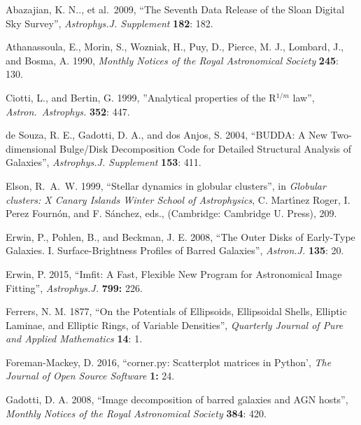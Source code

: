\documentclass[10pt,a4paper,article]{memoir}
\begin{document}
\begin{thebibliography}{}


 Abazajian, K. N.., et al.\ 2009, ``The Seventh 
Data Release of the Sloan Digital Sky Survey'', \textit{Astrophys.J. Supplement} \textbf{182}: 182.

 Athanassoula, E., Morin, S., Wozniak, H.,
Puy, D., Pierce, M. J., Lombard, J., and Bosma, A. 1990, \textit{Monthly Notices of the Royal
Astronomical Society} \textbf{245}: 130.

 Ciotti, L., and Bertin, G. 1999,
''Analytical properties of the R$^{1/m}$ law'', \textit{Astron.\ Astrophys.}
\textbf{352}: 447.

 de Souza, R. E.,
Gadotti, D. A., and dos Anjos, S. 2004, ``BUDDA: A New Two-dimensional Bulge/Disk
Decomposition Code for Detailed Structural Analysis of Galaxies'',
\textit{Astrophys.J. Supplement} \textbf{153}: 411.

 Elson, R.~A.~W. 1999, ``Stellar dynamics in globular clusters'',
in \textit{Globular clusters: X Canary Islands Winter School of Astrophysics}, 
C. Mart{\'{\i}}nez Roger, I. Perez Fourn{\'o}n, and F. S{\'a}nchez, eds., 
(Cambridge: Cambridge U. Press), 209.

 Erwin, P.,
Pohlen, B., and Beckman, J. E. 2008, ``The Outer Disks of Early-Type Galaxies. I. 
Surface-Brightness Profiles of Barred Galaxies'', \textit{Astron.J.} \textbf{135}: 20.

 Erwin, P. 2015, ``Imfit: A Fast, Flexible
New Program for Astronomical Image Fitting'', \textit{Astrophys.J.} \textbf{799:} 226.

 Ferrers, N. M. 1877, ``On the
Potentials of Ellipsoids, Ellipsoidal Shells, Elliptic Laminae, and
Elliptic Rings, of Variable Densities'', \textit{Quarterly Journal
of Pure and Applied Mathematics} \textbf{14}: 1.

 Foreman-Mackey, D. 2016,
``corner.py: Scatterplot matrices in Python', \textit{The Journal of Open Source Software}
\textbf{1:} 24.

 Gadotti, D. A. 2008, ``Image
decomposition of barred galaxies and AGN hosts'', \textit{Monthly
Notices of the Royal Astronomical Society} \textbf{384}: 420.


\end{thebibliography}
\end{document}
